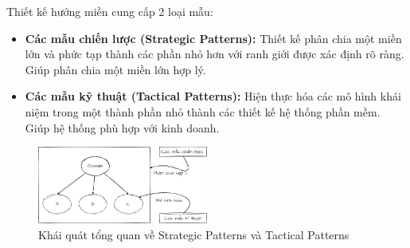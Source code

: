 Thiết kế hướng miền cung cấp 2 loại mẫu:

\begin{itemize}

\item \textbf{Các mẫu chiến lược (Strategic Patterns):} Thiết kế phân chia một miền lớn và phức tạp thành các phần nhỏ hơn với ranh giới được xác định rõ ràng. Giúp phân chia một miền lớn hợp lý.

\item \textbf{Các mẫu kỹ thuật (Tactical Patterns):} Hiện thực hóa các mô hình khái niệm trong một thành phần nhỏ thành các thiết kế hệ thống phần mềm. Giúp hệ thống phù hợp với kinh doanh.

\end{itemize}


\begin{figure}[H]
    \centering
    \includegraphics[width = 0.5\textwidth]{pictures/StrategicPatternsVATacticalPatterns/main.drawio.png}
    \caption{Khái quát tổng quan về Strategic Patterns và Tactical Patterns}
    \end{figure}

